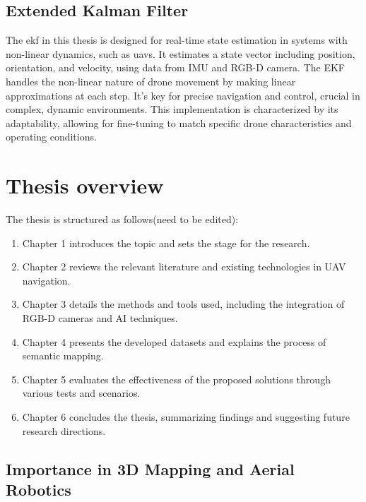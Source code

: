 \subsection{Extended Kalman Filter}
The \acrfull{ekf} in this thesis is designed for real-time state estimation in systems with non-linear dynamics, such as \acrshort{uavs}. It estimates a state vector including position, orientation, and velocity, using data from IMU and RGB-D camera. The EKF handles the non-linear nature of drone movement by making linear approximations at each step. It's key for precise navigation and control, crucial in complex, dynamic environments. This implementation is characterized by its adaptability, allowing for fine-tuning to match specific drone characteristics and operating conditions.

\section{Thesis overview}

The thesis is structured as follows(need to be edited):
\begin{enumerate}
\item Chapter 1 introduces the topic and sets the stage for the research.
\item Chapter 2 reviews the relevant literature and existing technologies in UAV navigation.
\item Chapter 3 details the methods and tools used, including the integration of RGB-D cameras and AI techniques.
\item Chapter 4 presents the developed datasets and explains the process of semantic mapping.
\item Chapter 5 evaluates the effectiveness of the proposed solutions through various tests and scenarios.
\item Chapter 6 concludes the thesis, summarizing findings and suggesting future research directions.
\end{enumerate}

\subsection*{Importance in 3D Mapping and Aerial Robotics}

